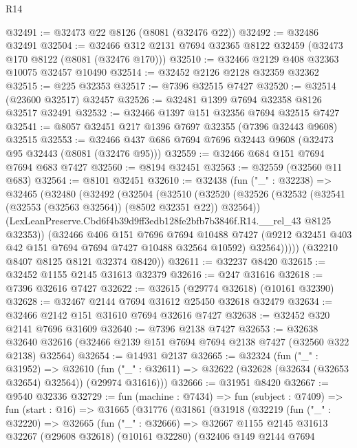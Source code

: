 \begin{lexlean}{R14}
\begin{coremodule}
@32491 := @32473 @22 @8126 (@8081 (@32476 @22))
@32492 := @32486 @32491
@32504 := @32466 @312 @2131 @7694 @32365 @8122 @32459 (@32473 @170 @8122 (@8081 (@32476 @170)))
@32510 := @32466 @2129 @408 @32363 @10075 @32457 @10490
@32514 := @32452 @2126 @2128 @32359 @32362
@32515 := @225 @32353
@32517 := @7396 @32515 @7427
@32520 := @32514 (@23600 @32517) @32457
@32526 := @32481 @1399 @7694 @32358 @8126 @32517 @32491
@32532 := @32466 @1397 @151 @32356 @7694 @32515 @7427
@32541 := @8057 @32451 @217 @1396 @7697 @32355 (@7396 @32443 @9608) @32515
@32553 := @32466 @437 @686 @7694 @7696 @32443 @9608 (@32473 @95 @32443 (@8081 (@32476 @95)))
@32559 := @32466 @684 @151 @7694 @7694 @683 @7427
@32560 := @8194 @32451
@32563 := @32559 (@32560 @11 @683)
@32564 := @8101 @32451
@32610 := @32438
    (fun ("_" : @32238) =>
    @32465
      (@32480
        (@32492
          (@32504
            (@32510
              (@32520
                (@32526 (@32532 (@32541 (@32553 (@32563 @32564)) (@8502 @32351 @22)) @32564))
                (LexLeanPreserve.Cbd6f4b39d9ff3edb128fe2bfb7b3846f.R14.__rel_43 @8125 @32353))
              (@32466
                @406
                @151
                @7696
                @7694
                @10488
                @7427
                (@9212 @32451 @403 @42 @151 @7694 @7694 @7427 @10488 @32564 @10592)
                @32564)))))
      (@32210 @8407 @8125 @8121 @32374 @8420))
@32611 := @32237 @8420
@32615 := @32452 @1155 @2145 @31613 @32379
@32616 := @247 @31616
@32618 := @7396 @32616 @7427
@32622 := @32615 (@29774 @32618) (@10161 @32390)
@32628 := @32467 @2144 @7694 @31612 @25450 @32618 @32479
@32634 := @32466 @2142 @151 @31610 @7694 @32616 @7427
@32638 := @32452 @320 @2141 @7696 @31609
@32640 := @7396 @2138 @7427
@32653 := @32638
    @32640
    @32616
    (@32466 @2139 @151 @7694 @7694 @2138 @7427 (@32560 @322 @2138) @32564)
@32654 := @14931 @2137
@32665 := @32324
    (fun ("_" : @31952) =>
    @32610 (fun ("_" : @32611) => @32622 (@32628 (@32634 (@32653 @32654) @32564)) (@29974 @31616)))
@32666 := @31951 @8420
@32667 := @9540 @32336
@32729 := fun (machine : @7434) =>
  fun (subject : @7409) =>
  fun (start : @16) =>
  @31665
    (@31776
      (@31861
        (@31918
          (@32219
            (fun ("_" : @32220) =>
            @32665
              (fun ("_" : @32666) =>
              @32667
                @1155
                @2145
                @31613
                @32267
                (@29608 @32618)
                (@10161 @32280)
                (@32406
                  @149
                  @2144
                  @7694

\end{coremodule}
\end{lexlean}

